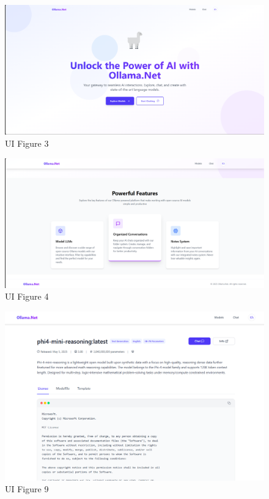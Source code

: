 \begin{figure}[p]
    \centering
    \includegraphics[width=\textwidth]{./Chapter07/figures/3.png}
    \caption{UI Figure 3}
    \label{fig:ui-figure-3}
\end{figure}
\clearpage

\begin{figure}[p]
    \centering
    \includegraphics[width=\textwidth]{./Chapter07/figures/4.png}
    \caption{UI Figure 4}
    \label{fig:ui-figure-4}
\end{figure}
\clearpage

\begin{figure}[p]
    \centering
    \includegraphics[width=\textwidth]{./Chapter07/figures/9.png}
    \caption{UI Figure 9}
    \label{fig:ui-figure-9}
\end{figure}
\clearpage

